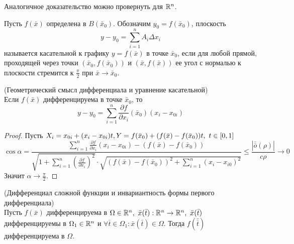 \begin{comm}
    Аналогичное доказательство можно провернуть для $\mathbb{R}^n$.
\end{comm}
\begin{definition}
    Пусть $f(\bar{x})$ определена в $B(\bar{x}_0)$. Обозначим $y_0=f(\bar{x}_0)$, плоскость
    \[y-y_0=\sum\limits_{i=1}^{n}A_i \Delta x_i\]
    называется касательной к графику $y=f(\bar{x})$ в точке $\bar{x}_0$, если для любой прямой, проходящей через точки $(\bar{x}_0, f(\bar{x}_0))$ и $(\bar{x}, f(\bar{x}))$ ее угол с нормалью к плоскости стремится к $\frac{\pi}{2}$ при $\bar{x}\to \bar{x}_0$.
\end{definition} 
\begin{theorem} (Геометрический смысл дифференциала и уравнение касательной)\\
    Если $f(\bar{x})$ дифференцируема в точке $\bar{x}_0$, то 
    \[y-y_0=\sum\limits_{i=1}^{n}\frac{\partial {f}}{\partial {x_i}}(\bar{x}_0)(x_i-x_{0i})\]
\end{theorem} 
\begin{proof}
    Пусть $X_i=x_{0i}+(x_i-x_{0i})t,\\ Y=f(\bar{x}_0)+(f(\bar{x})-f(\bar{x}_0))t,\ t\in [0,1]$
    \[\cos{\alpha}=\frac{\sum\limits_{i=1}^{n}\frac{\partial {f}}{\partial {x_i}}(x_i-x_{0i})-(f(\bar{x})-f(\bar{x}_0))}{\sqrt{1+\sum\limits_{i=1}^{n}(\frac{\partial {f}}{\partial {x_i}})^2}\cdot \sqrt{(f(\bar{x})-f(\bar{x}_0))^2+\sum\limits_{i=1}^{n}(x_i-x_{i0})^2}}\leq \frac{|\bar{\bar{o}}{(\rho)}|}{c\rho}\to 0\]
    Значит $\alpha \to \frac{\pi}{2}$.
\end{proof} 
\begin{theorem} (Дифференциал сложной функции и инвариантность формы первого дифференциала)\\
    Пусть $f(\bar{x})$ дифференцируема в $\Omega\in \R^n,\ \bar{x}(\bar{t}): \R^n\to \R^n,\ \bar{x}(\bar{t})$ дифференцируемы в $\Omega_1\in \mathbb{R}^n$ и $\forall \bar{t}\in \Omega_1: \bar{x}(\bar{t})\in \Omega$. Тогда $f(\bar{\bar{t}})$ дифференцируема в $\Omega$.
\end{theorem} 
